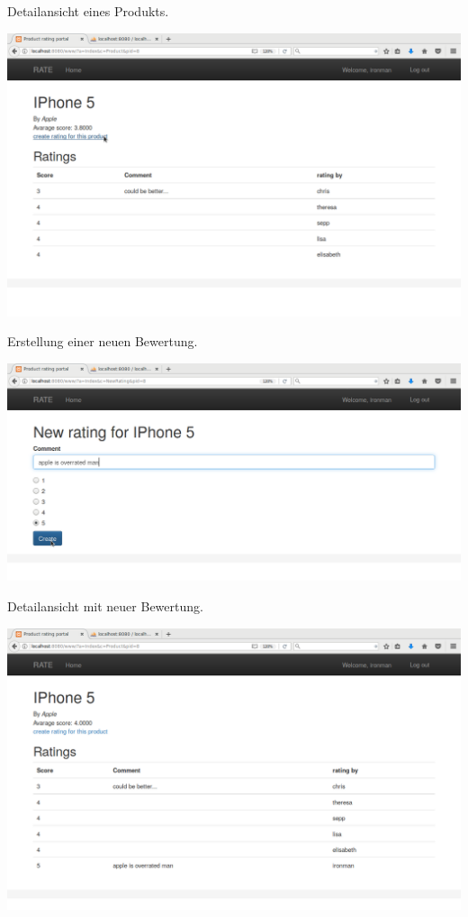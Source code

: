 \documentclass{article}
\begin{document}
Detailansicht eines Produkts.

\includegraphics[width=1.0\textwidth]{5.png}

Erstellung einer neuen Bewertung.

\includegraphics[width=1.0\textwidth]{6.png}

Detailansicht mit neuer Bewertung.

\includegraphics[width=1.0\textwidth]{7.png}
\end{document}
